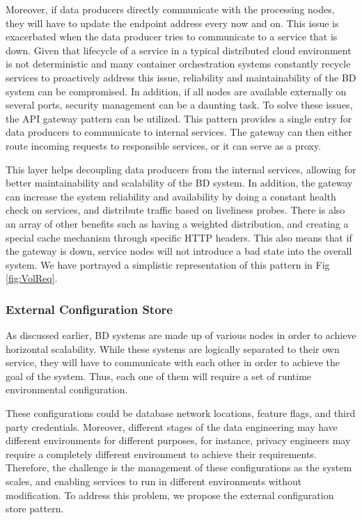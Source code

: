 \documentclass{bmcart}
\begin{document}
Moreover, if data producers directly communicate with the processing nodes, they will have to update the endpoint address every now and on. This issue is exacerbated when the data producer tries to communicate to a service that is down. Given that lifecycle of a service in a typical distributed cloud environment is not deterministic and many container orchestration systems constantly recycle services to proactively address this issue, reliability and maintainability of the BD system can be compromised. In addition, if all nodes are available externally on several ports, security management can be a daunting task. To solve these issues, the API gateway pattern can be utilized. This pattern provides a single entry for data producers to communicate to internal services. The gateway can then either route incoming requests to responsible services, or it can serve as a proxy.

This layer helps decoupling data producers from the internal services, allowing for better maintainability and scalability of the BD system. In addition, the gateway can increase the system reliability and availability by doing a constant health check on services, and distribute traffic based on liveliness probes. There is also an array of other benefits such as having a weighted distribution, and creating a special cache mechanism through specific HTTP headers. This also means that if the gateway is down, service nodes will not introduce a bad state into the overall system. We have portrayed a simplistic representation of this pattern in Fig \ref{fig:VolReq}. 

\subsubsection{External Configuration Store}

As discussed earlier, BD systems are made up of various nodes in order to achieve horizontal scalability. While these systems are logically separated to their own service, they will have to communicate with each other in order to achieve the goal of the system. Thus, each one of them will require a set of runtime environmental configuration. 

These configurations could be database network locations, feature flags, and third party credentials. Moreover, different stages of the data engineering may have different environments for different purposes, for instance, privacy engineers may require a completely different environment to achieve their requirements. Therefore, the challenge is the management of these configurations as the system scales, and enabling services to run in different environments without modification. To address this problem, we propose the external configuration store pattern.
\end{document}
